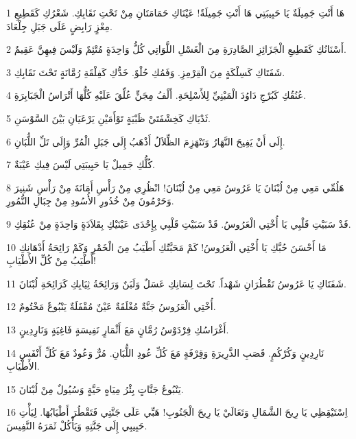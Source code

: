 \par 1 هَا أَنْتِ جَمِيلَةٌ يَا حَبِيبَتِي هَا أَنْتِ جَمِيلَةٌ! عَيْنَاكِ حَمَامَتَانِ مِنْ تَحْتِ نَقَابِكِ. شَعْرُكِ كَقَطِيعِ مِعْزٍ رَابِضٍ عَلَى جَبَلِ جِلْعَادَ.
\par 2 أَسْنَانُكِ كَقَطِيعِ الْجَزَائِزِ الصَّادِرَةِ مِنَ الْغَسْلِ اللَّوَاتِي كُلُّ وَاحِدَةٍ مُتْئِمٌ وَلَيْسَ فِيهِنَّ عَقِيمٌ.
\par 3 شَفَتَاكِ كَسِلْكَةٍ مِنَ الْقِرْمِزِ. وَفَمُكِ حُلْوٌ. خَدُّكِ كَفِلْقَةِ رُمَّانَةٍ تَحْتَ نَقَابِكِ.
\par 4 عُنُقُكِ كَبُرْجِ دَاوُدَ الْمَبْنِيِّ لِلأَسْلِحَةِ. أَلْفُ مِجَنٍّ عُلِّقَ عَلَيْهِ كُلُّهَا أَتْرَاسُ الْجَبَابِرَةِ.
\par 5 ثَدْيَاكِ كَخِشْفَتَيْ ظَبْيَةٍ تَوْأَمَيْنِ يَرْعَيَانِ بَيْنَ السَّوْسَنِ.
\par 6 إِلَى أَنْ يَفِيحَ النَّهَارُ وَتَنْهَزِمَ الظِّلاَلُ أَذْهَبُ إِلَى جَبَلِ الْمُرِّ وَإِلَى تَلِّ اللُّبَانِ.
\par 7 كُلُّكِ جَمِيلٌ يَا حَبِيبَتِي لَيْسَ فِيكِ عَيْبَةٌ.
\par 8 هَلُمِّي مَعِي مِنْ لُبْنَانَ يَا عَرُوسُ مَعِي مِنْ لُبْنَانَ! انْظُرِي مِنْ رَأْسِ أَمَانَةَ مِنْ رَأْسِ شَنِيرَ وَحَرْمُونَ مِنْ خُدُورِ الأُسُودِ مِنْ جِبَالِ النُّمُورِ.
\par 9 قَدْ سَبَيْتِ قَلْبِي يَا أُخْتِي الْعَرُوسُ. قَدْ سَبَيْتِ قَلْبِي بِإِحْدَى عَيْنَيْكِ بِقَلاَدَةٍ وَاحِدَةٍ مِنْ عُنُقِكِ.
\par 10 مَا أَحْسَنَ حُبَّكِ يَا أُخْتِي الْعَرُوسُ! كَمْ مَحَبَّتُكِ أَطْيَبُ مِنَ الْخَمْرِ وَكَمْ رَائِحَةُ أَدْهَانِكِ أَطْيَبُ مِنْ كُلِّ الأَطْيَابِ!
\par 11 شَفَتَاكِ يَا عَرُوسُ تَقْطُرَانِ شَهْداً. تَحْتَ لِسَانِكِ عَسَلٌ وَلَبَنٌ وَرَائِحَةُ ثِيَابِكِ كَرَائِحَةِ لُبْنَانَ.
\par 12 أُخْتِي الْعَرُوسُ جَنَّةٌ مُغْلَقَةٌ عَيْنٌ مُقْفَلَةٌ يَنْبُوعٌ مَخْتُومٌ.
\par 13 أَغْرَاسُكِ فِرْدَوْسُ رُمَّانٍ مَعَ أَثْمَارٍ نَفِيسَةٍ فَاغِيَةٍ وَنَارِدِينٍ.
\par 14 نَارِدِينٍ وَكُرْكُمٍ. قَصَبِ الذَّرِيرَةِ وَقِرْفَةٍ مَعَ كُلِّ عُودِ اللُّبَانِ. مُرٌّ وَعُودٌ مَعَ كُلِّ أَنْفَسِ الأَطْيَابِ.
\par 15 يَنْبُوعُ جَنَّاتٍ بِئْرُ مِيَاهٍ حَيَّةٍ وَسُيُولٌ مِنْ لُبْنَانَ.
\par 16 اِسْتَيْقِظِي يَا رِيحَ الشَّمَالِ وَتَعَالَيْ يَا رِيحَ الْجَنُوبِ! هَبِّي عَلَى جَنَّتِي فَتَقْطُرَ أَطْيَابُهَا. لِيَأْتِ حَبِيبِي إِلَى جَنَّتِهِ وَيَأْكُلْ ثَمَرَهُ النَّفِيسَ.

